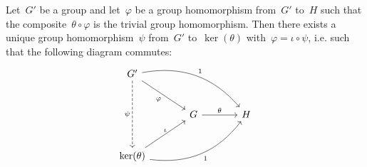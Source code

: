 \section{}

Let~$G'$ be a group and let~$\varphi$ be a group homomorphism from~$G'$ to~$H$ such that the composite~$\theta \circ \varphi$ is the trivial group homomorphism.
Then there exists a unique group homomorphism~$\psi$ from~$G'$ to~$\ker(\theta)$ with~$\varphi = \iota \circ \psi$, i.e. such that the following diagram commutes:
\[
	\begin{tikzcd}[sep = large]
		G'
		\arrow{dr}[below left]{\varphi}
		\arrow[bend left]{drr}[above right]{1}
		\arrow[dashed]{dd}[left]{\psi}
		&
		{}
		&
		{}
		\\
		{}
		&
		G
		\arrow{r}[above]{\theta}
		&
		H
		\\
		\ker(\theta)
		\arrow{ur}[above]{\iota}
		\arrow[bend right]{urr}[below right]{1}
		&
		{}
		&
		{}
	\end{tikzcd}
\]
